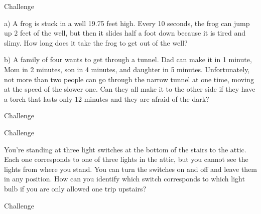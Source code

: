 \begin{tagblock}{Challenge}
\begin{question}[CHALLENGE!!!]
	
a) A frog is stuck in a well 19.75 feet high. Every 10 seconds, the frog can jump up 2 feet of the well, but then it slides half a foot down because it is tired and slimy. How long does it take the frog to get out of the well? 

\bigskip

b) A family of four wants to get through a tunnel. Dad can make it in 1 minute, Mom in 2 minutes, son in 4 minutes, and daughter in 5 minutes. Unfortunately, not more than two people can go through the narrow tunnel at one time, moving at the speed of the slower one. Can they all make it to the other side if they have a torch that lasts only 12 minutes and they are afraid of the dark? 
	
	
\begin{tags}
	    Challenge
\end{tags}
	
\begin{diary}
\end{diary}
		
\begin{solution}
       
\end{solution}

\end{question}

\end{tagblock}

\begin{tagblock}{Challenge}
\begin{question}[CHALLENGE!!!]
	
You're standing at three light switches at the bottom of the stairs to the attic. Each one corresponds to one of three lights in the attic, but you cannot see the lights from where you stand. You can turn the switches on and off and leave them in any position. How can you identify which switch corresponds to which light bulb if you are only allowed one trip upstairs? 
	
	
\begin{tags}
	    Challenge
\end{tags}
	
\begin{diary}
\end{diary}
		
\begin{solution}
       
\end{solution}

\end{question}

\end{tagblock}

